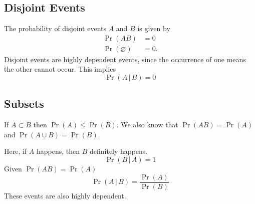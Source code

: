 \documentclass{article}
\begin{document}
\subsection{Disjoint Events}
\begin{theorem}
    The probability of disjoint events \(A\) and \(B\) is given by
    \begin{align*}
        \Pr{\left( AB \right)}          & = 0  \\
        \Pr{\left( \varnothing \right)} & = 0.
    \end{align*}
    Disjoint events are highly dependent events, since the occurrence of one means the other cannot occur.
    This implies
    \begin{equation*}
        \Pr{\left( A \,\vert\, B \right)} = 0
    \end{equation*}
\end{theorem}
\subsection{Subsets}
\begin{theorem}
    If \(A \subset B\) then \(\Pr{\left( A \right)} \leq \Pr{\left( B \right)}\).
    We also know that \(\Pr{\left( AB \right)} = \Pr{\left( A \right)}\) and \(\Pr{\left( A \cup B \right)} = \Pr{\left( B \right)}\).

    Here, if \(A\) happens, then \(B\) definitely happens.
    \begin{equation*}
        \Pr{\left( B \,\vert\, A \right)} = 1
    \end{equation*}
    Given \(\Pr{\left( AB \right)} = \Pr{\left( A \right)}\)
    \begin{equation*}
        \Pr{\left( A \,\vert\, B \right)} = \frac{\Pr{\left( A \right)}}{\Pr{\left( B \right)}}
    \end{equation*}
    These events are also highly dependent.
\end{theorem}
\end{document}
